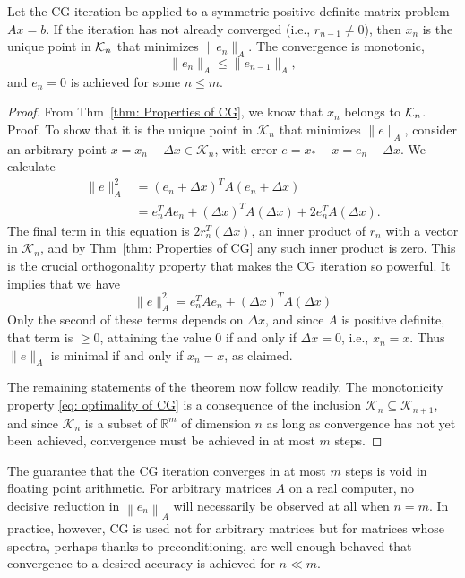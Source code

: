 \begin{theorem}
[Optimality of CG]
\label{thm: Optimality of CG}
Let the CG iteration be applied to a symmetric positive definite matrix problem $ Ax=b $. If the iteration has not already converged (i.e., $ r_{n-1}\neq 0 $), then $ x_n $ is the unique point in $ \mathcal{K}_n $ that minimizes $ \|e_n\|_A $. The convergence is monotonic, 
\begin{equation}
\label{eq: optimality of CG}
    \|e_n \|_A \le \|e_{n-1}\|_A,
\end{equation}
and $ e_n = 0 $ is achieved for some $ n\le m $. 
\end{theorem}

\begin{proof}
From Thm~\ref{thm: Properties of CG}, we know that $ x_n $ belongs to $ \mathcal{K}_n $. Proof.  To show that it is the unique point in $\mathcal{K}_n$ that minimizes $\|e\|_A$, consider an arbitrary point $x=x_n-\Delta x \in \mathcal{K}_n$, with error $e=x_*-x=e_n+\Delta x$. We calculate
$$
\begin{aligned}
\|e\|_A^2 & =\left(e_n+\Delta x\right)^T A\left(e_n+\Delta x\right) \\
& =e_n^T A e_n+(\Delta x)^T A(\Delta x)+2 e_n^T A(\Delta x) .
\end{aligned}
$$
The final term in this equation is $2 r_n^T(\Delta x)$, an inner product of $r_n$ with a vector in $\mathcal{K}_n$, and by Thm~\ref{thm: Properties of CG} any such inner product is zero. This is the crucial orthogonality property that makes the CG iteration so powerful. It implies that we have
$$
\|e\|_A^2=e_n^T A e_n+(\Delta x)^T A(\Delta x)
$$
Only the second of these terms depends on $\Delta x$, and since $A$ is positive definite, that term is $\geq 0$, attaining the value 0 if and only if $\Delta x=0$, i.e., $x_n=x$. Thus $\|e\|_A$ is minimal if and only if $x_n=x$, as claimed.

The remaining statements of the theorem now follow readily. The monotonicity property \eqref{eq: optimality of CG} is a consequence of the inclusion $\mathcal{K}_n \subseteq \mathcal{K}_{n+1}$, and since $\mathcal{K}_n$ is a subset of $\mathbb{R}^m$ of dimension $n$ as long as convergence has not yet been achieved, convergence must be achieved in at most $m$ steps.
\end{proof}
The guarantee that the CG iteration converges in at most $m$ steps is void in floating point arithmetic. For arbitrary matrices $A$ on a real computer, no decisive reduction in $\left\|e_n\right\|_A$ will necessarily be observed at all when $n=m$. In practice, however, CG is used not for arbitrary matrices but for matrices whose spectra, perhaps thanks to preconditioning, are well-enough behaved that convergence to a desired accuracy is achieved for $n \ll m$.

